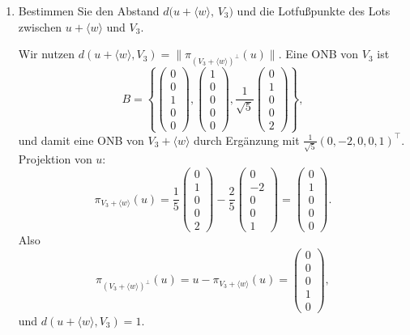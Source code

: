 \documentclass[11pt, a4paper]{article}
\begin{document}
\begin{enumerate}
  \item Bestimmen Sie den Abstand $d\bigl(u+\langle w\rangle,\,V_3\bigr)$ und die Lotfußpunkte des Lots zwischen $u+\langle w\rangle$ und $V_3$.
  \begin{framed}
  Wir nutzen $d(u+\langle w\rangle,V_3)=\|\pi_{(V_3+\langle w\rangle)^\perp}(u)\|$.
  Eine ONB von $V_3$ ist
  \[
  B=\left\{\begin{pmatrix}0\\0\\1\\0\\0\end{pmatrix},
  \begin{pmatrix}1\\0\\0\\0\\0\end{pmatrix},
  \frac{1}{\sqrt5}\begin{pmatrix}0\\1\\0\\0\\2\end{pmatrix}\right\},
  \]
  und damit eine ONB von $V_3+\langle w\rangle$ durch Ergänzung mit
  $\frac{1}{\sqrt5}(0,-2,0,0,1)^{\top}$.
  Projektion von $u$:
  \[
  \pi_{V_3+\langle w\rangle}(u)
  =\frac{1}{5}\begin{pmatrix}0\\1\\0\\0\\2\end{pmatrix}
  -\frac{2}{5}\begin{pmatrix}0\\-2\\0\\0\\1\end{pmatrix}
  =\begin{pmatrix}0\\1\\0\\0\\0\end{pmatrix}.
  \]
  Also
  \[
  \pi_{(V_3+\langle w\rangle)^\perp}(u)
  =u-\pi_{V_3+\langle w\rangle}(u)
  =\begin{pmatrix}0\\0\\0\\1\\0\end{pmatrix},
  \]
  und $d(u+\langle w\rangle,V_3)=1$.


\end{framed}
\end{enumerate}
\end{document}
